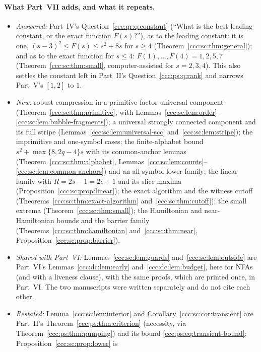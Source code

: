 \documentclass[11pt,letterpaper]{article}
\theoremstyle{definition}
\theoremstyle{remark}
\begin{document}
\paragraph{What Part~VII adds, and what it repeats.}
\begin{itemize}[leftmargin=1.4em,itemsep=1pt]
\item \emph{Answered:} Part~IV's Question~\ref{ccc:qr:q:constant} (``What is
 the best leading constant, or the exact function $F(s)$?''), as to the
 leading constant: it is one, $(s-3)^2\le F(s)\le s^2+8s$ for $s\ge4$
 (Theorem~\ref{ccc:sc:thm:general}); and as to the exact function for
 $s\le4$: $F(1),\ldots,F(4)=1,2,5,7$ (Theorem~\ref{ccc:sc:thm:small},
 computer-assisted for $s=2,3,4$). This also settles the constant left in
 Part~II's Question~\ref{ccc:ps:q:rank} and narrows Part~V's $[1,2]$ to $1$.
\item \emph{New:} robust compression in a primitive factor-universal
 component (Theorem~\ref{ccc:sc:thm:primitive}, with
 Lemmas~\ref{ccc:sc:lem:order}--\ref{ccc:sc:lem:bubble-fragments}); a
 universal strongly connected component and its full stripe
 (Lemmas~\ref{ccc:sc:lem:universal-scc} and~\ref{ccc:sc:lem:stripe}); the
 imprimitive and one-symbol cases; the finite-alphabet bound
 $s^2+\max\{8,2q-4\}s$ with its common-anchor lemmas
 (Theorem~\ref{ccc:sc:thm:alphabet},
 Lemmas~\ref{ccc:sc:lem:counts}--\ref{ccc:sc:lem:common-anchors}) and an
 all-symbol lower family; the linear family with $R=2s-1=2e+1$ and its slice
 maxima (Proposition~\ref{ccc:sc:prop:linear}); the exact algorithm and the
 witness cutoff (Theorems~\ref{ccc:sc:thm:exact-algorithm}
 and~\ref{ccc:sc:thm:cutoff}); the small extrema
 (Theorem~\ref{ccc:sc:thm:small}); the Hamiltonian and near-Hamiltonian
 bounds and the barrier family (Theorems~\ref{ccc:sc:thm:hamiltonian}
 and~\ref{ccc:sc:thm:near}, Proposition~\ref{ccc:sc:prop:barrier}).
\item \emph{Shared with Part~VI:} Lemmas~\ref{ccc:sc:lem:guards}
 and~\ref{ccc:sc:lem:outside} are Part~VI's Lemmas~\ref{ccc:dc:lem:early}
 and~\ref{ccc:dc:lem:budget}, here for NFAs (and with a liveness clause), with
 the same proofs, which are printed once, in Part~VI. The two manuscripts
 were written separately and do not cite each other.
\item \emph{Restated:} Lemma~\ref{ccc:sc:lem:interior} and
 Corollary~\ref{ccc:sc:cor:transient} are Part~II's
 Theorem~\ref{ccc:ps:thm:criterion} (necessity, via
 Theorem~\ref{ccc:ps:thm:pumping}) and its bound
 \eqref{ccc:ps:eq:transient-bound}; Proposition~\ref{ccc:sc:prop:lower} is

\end{itemize}
\end{document}
